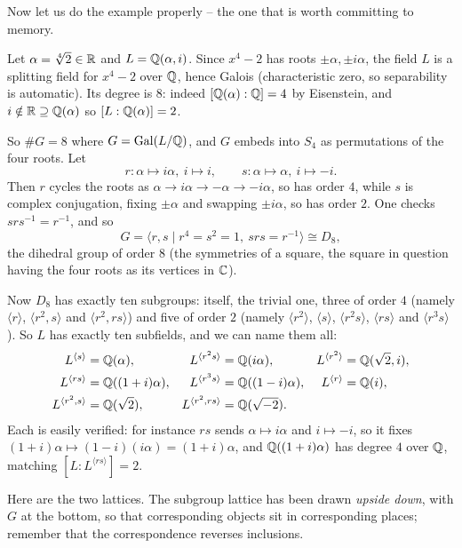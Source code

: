 \documentclass[a4paper]{scrartcl}
\newcommand{\Gal}{\operatorname{Gal}}
\begin{document}
Now let us do the example properly -- the one that is worth committing to memory.

\begin{example}\label{ex:biglattice}
	Let $\alpha = \sqrt[4]{2} \in \mathbb{R}$ and $L = \mathbb{Q}(\alpha, i)$. Since $x^4 - 2$ has roots $\pm\alpha, \pm i\alpha$, the field $L$ is a splitting field for $x^4-2$ over $\mathbb{Q}$, hence Galois (characteristic zero, so separability is automatic). Its degree is $8$: indeed $[\mathbb{Q}(\alpha):\mathbb{Q}] = 4$ by Eisenstein, and $i \notin \mathbb{R} \supseteq \mathbb{Q}(\alpha)$ so $[L:\mathbb{Q}(\alpha)] = 2$.

	So $\#G = 8$ where $G = \Gal(L/\Q)$, and $G$ embeds into $S_4$ as permutations of the four roots. Let
	$$r : \alpha \mapsto i\alpha,\ i \mapsto i, \qquad s : \alpha\mapsto\alpha,\ i \mapsto -i.$$
	Then $r$ cycles the roots as $\alpha \to i\alpha \to -\alpha \to -i\alpha$, so has order $4$, while $s$ is complex conjugation, fixing $\pm\alpha$ and swapping $\pm i\alpha$, so has order $2$. One checks $srs^{-1} = r^{-1}$, and so
	$$G = \langle r, s \mid r^4 = s^2 = 1,\ srs = r^{-1}\rangle \cong D_8,$$
	the dihedral group of order $8$ (the symmetries of a square, the square in question having the four roots as its vertices in $\mathbb{C}$).

	Now $D_8$ has exactly ten subgroups: itself, the trivial one, three of order $4$ (namely $\langle r\rangle$, $\langle r^2, s\rangle$ and $\langle r^2, rs\rangle$) and five of order $2$ (namely $\langle r^2\rangle$, $\langle s\rangle$, $\langle r^2s\rangle$, $\langle rs\rangle$ and $\langle r^3 s\rangle$). So $L$ has exactly ten subfields, and we can name them all:
	\begin{align*}
		L^{\langle s\rangle} &= \mathbb{Q}(\alpha), & L^{\langle r^2s\rangle} &= \mathbb{Q}(i\alpha), & L^{\langle r^2\rangle} &= \mathbb{Q}(\sqrt2, i),\\
		L^{\langle rs\rangle} &= \mathbb{Q}((1+i)\alpha), & L^{\langle r^3s\rangle} &= \mathbb{Q}((1-i)\alpha), & L^{\langle r\rangle} &= \mathbb{Q}(i),\\
		L^{\langle r^2,s\rangle} &= \mathbb{Q}(\sqrt 2), & L^{\langle r^2, rs\rangle} &= \mathbb{Q}(\sqrt{-2}). &&
	\end{align*}
	Each is easily verified: for instance $rs$ sends $\alpha \mapsto i\alpha$ and $i \mapsto -i$, so it fixes $(1+i)\alpha \mapsto (1-i)(i\alpha) = (1+i)\alpha$, and $\mathbb{Q}((1+i)\alpha)$ has degree $4$ over $\mathbb{Q}$, matching $[L:L^{\langle rs\rangle}] = 2$.

	Here are the two lattices. The subgroup lattice has been drawn \emph{upside down}, with $G$ at the bottom, so that corresponding objects sit in corresponding places; remember that the correspondence reverses inclusions.


\end{example}
\end{document}

